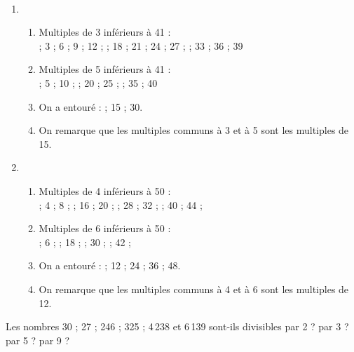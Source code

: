 \begin{colonne*exercice}
\begin{corrige}
   \ \\ [-5mm]
   \begin{enumerate}
      \item 
      \begin{enumerate}
         \item Multiples de 3 inférieurs à 41 : \\ \smallskip
            {\blue {} ; 3 ; 6 ; 9 ; 12 ;  ; 18 ; 21 ; 24 ; 27 ;  ; 33 ; 36 ; 39} \smallskip
         \item Multiples de 5 inférieurs à 41 : \\ \smallskip
            {\blue {} ; 5 ; 10 ;  ; 20 ; 25 ;  ; 35 ; 40} \smallskip
         \item On a entouré : { ; 15 ; 30}.
         \item On remarque que les multiples communs à 3 et à 5 sont les {\blue multiples de 15}.
      \end{enumerate}
      \setcounter{enumi}{1}
      \item
      \begin{enumerate}
         \item Multiples de 4 inférieurs à 50 : \\ \smallskip
            {\blue {} ; 4 ; 8 ;  ; 16 ; 20 ;  ; 28 ; 32 ;  ; 40 ; 44 ; } \smallskip
         \item Multiples de 6 inférieurs à 50 : \\ \smallskip
            {\blue {} ; 6 ;  ; 18 ;  ; 30 ;  ; 42 ; } \smallskip
         \item On a entouré : { ; 12 ; 24 ; 36 ; 48}.
         \item On remarque que les multiples communs à 4 et à 6 sont les {\blue multiples de 12}.
      \end{enumerate}
   \end{enumerate}
\end{corrige}

\bigskip



\bigskip

\begin{exercice} %
   Les nombres 30 ; 27 ; 246 ; 325 ; 4\,238 et 6\,139 sont-ils divisibles par 2 ? par 3 ? par 5 ? par 9 ?
\end{exercice}


\end{colonne*exercice}
